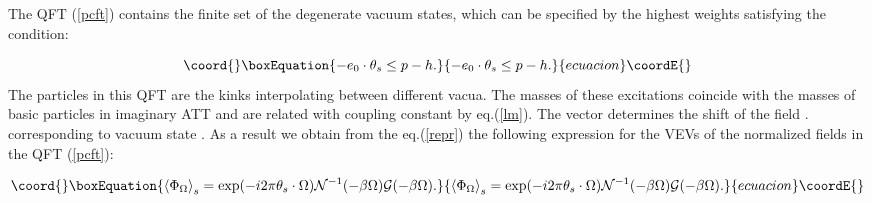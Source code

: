\documentclass[a4paper,12pt]{article}
\begin{document}
The QFT (\ref{pcft}) contains the finite set \coordHE{} of the degenerate
vacuum states, which can be specified by the highest weights \coordHE{}
satisfying the condition:

\begin{equation}\coord{}\boxEquation{ 
-e_0\cdot \theta _s\leq p-h.  \label{iNql}
}{ 
-e_0\cdot \theta _s\leq p-h.  }{ecuacion}\coordE{}\end{equation}
The particles in
this QFT are the kinks interpolating between different vacua. The masses of
these excitations coincide with the masses of basic particles in imaginary
ATT and are related with coupling constant \myHighlight{$\lambda $}\coordHE{} by eq.(\ref{lm}). The
vector \coordHE{} determines the shift of the field \coordHE{}. corresponding to vacuum state \coordHE{}. 
As a result we obtain from the eq.(\ref{repr}) the following expression
for the VEVs of the normalized fields \myHighlight{$\Phi _\Omega $}\coordHE{} in the QFT (\ref{pcft}):

\begin{equation}\coord{}\boxEquation{
\left\langle \Phi _\Omega \right\rangle _s=\exp (-i2\pi \theta _s\cdot
\Omega ){\cal N}^{-1}(-\beta \Omega ){\cal G}(-\beta \Omega ).  \label{wv}
}{
\left\langle \Phi _\Omega \right\rangle _s=\exp (-i2\pi \theta _s\cdot
\Omega ){\cal N}^{-1}(-\beta \Omega ){\cal G}(-\beta \Omega ).  }{ecuacion}\coordE{}\end{equation}
\end{document}
